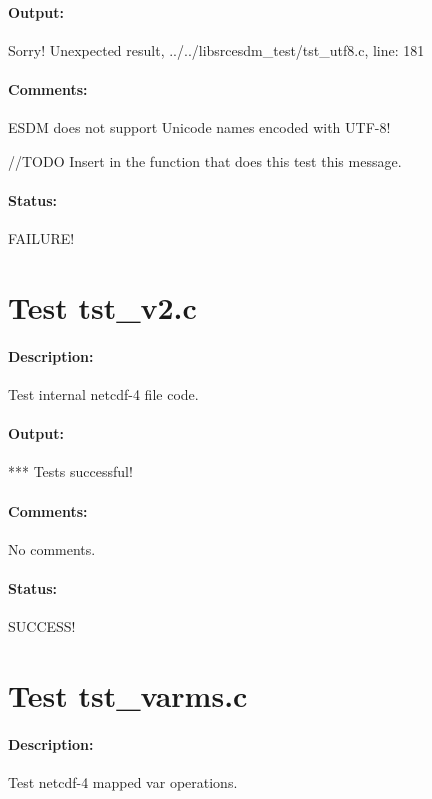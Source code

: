 \paragraph{Output:} Sorry! Unexpected result, ../../libsrcesdm\_test/tst\_utf8.c, line: 181

\paragraph{Comments:} ESDM does not support Unicode names encoded with UTF-8!

//TODO Insert in the function that does this test this message.

\paragraph{Status:} FAILURE!

{\color{blue}{Help, Julian!}}

\section{Test tst\_v2.c}

\paragraph{Description:} Test internal netcdf-4 file code.

\paragraph{Output:} *** Tests successful!

\paragraph{Comments:} No comments.

\paragraph{Status:} SUCCESS!

\section{Test tst\_varms.c}

\paragraph{Description:} Test netcdf-4 mapped var operations.

